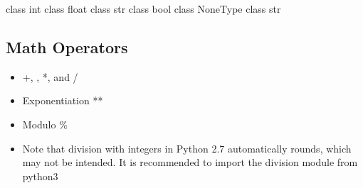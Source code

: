 \documentclass[letterpaper,10pt,english]{sphinxmanual}
\begin{document}
\begin{sphinxVerbatim}[commandchars=\\\{\}]
  

  

  

  

  

\end{sphinxVerbatim}

\begin{sphinxVerbatim}[commandchars=\\\{\}]
\PYGZlt{}class \PYGZsq{}int\PYGZsq{}\PYGZgt{}
\PYGZlt{}class \PYGZsq{}float\PYGZsq{}\PYGZgt{}
\PYGZlt{}class \PYGZsq{}str\PYGZsq{}\PYGZgt{}
\PYGZlt{}class \PYGZsq{}bool\PYGZsq{}\PYGZgt{}
\PYGZlt{}class \PYGZsq{}NoneType\PYGZsq{}\PYGZgt{}
\PYGZlt{}class \PYGZsq{}str\PYGZsq{}\PYGZgt{}
\end{sphinxVerbatim}


\subsection{Math Operators}
\label{\detokenize{content/Introduction_to_Programming:math-operators}}\begin{itemize}
\item {} 
+, \sphinxhyphen{}, *, and /

\item {} 
Exponentiation **

\item {} 
Modulo \%

\item {} 
Note that division with integers in Python 2.7 automatically rounds, which may not be intended.  It is recommended to import the division module from python3 

\end{itemize}
\end{document}
